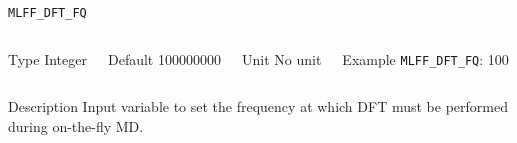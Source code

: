 \begin{frame}[allowframebreaks]{\texttt{{MLFF\_DFT\_FQ}}} \label{MLFF_DFT_FQ}
\vspace*{-12pt}
\begin{columns}
\begin{block}{Type}
Integer
\end{block}

\begin{block}{Default}
100000000
\end{block}

\begin{block}{Unit}
No unit
\end{block}

\begin{block}{Example}
\texttt{MLFF\_DFT\_FQ}: 100
\end{block}
\end{columns}

\begin{block}{Description}
Input variable to set the frequency at which DFT must be performed during on-the-fly MD.
\end{block}

\end{frame}
